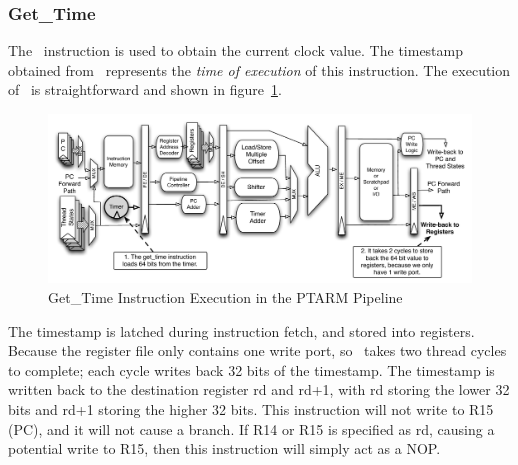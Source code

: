 \subsubsection{Get\_Time}    
The \gettime\ instruction is used to obtain the current clock value.
The timestamp obtained from \gettime\ represents the \emph{time of execution} of this instruction.
The execution of \gettime\ is straightforward and shown in figure~\ref{fig:get_time_pipeline_implementation}. 
\begin{figure}[h]
  
  \begin{center}
    \includegraphics[scale=.54]{figs/get_time_pipeline_implementation}
  \end{center}
  \vspace{-3mm}
  \caption{Get\_Time Instruction Execution in the PTARM Pipeline}
  \label{fig:get_time_pipeline_implementation}
\end{figure}
The timestamp is latched during instruction fetch, and stored into registers.
Because the register file only contains one write port, so \gettime\ takes two thread cycles to complete; each cycle writes back 32 bits of the timestamp. 
The timestamp is written back to the destination register rd and rd+1, with rd storing the lower 32 bits and rd+1 storing the higher 32 bits. 
This instruction will not write to R15 (PC), and it will not cause a branch. 
If R14 or R15 is specified as rd, causing a potential write to R15, then this instruction will simply act as a NOP.

